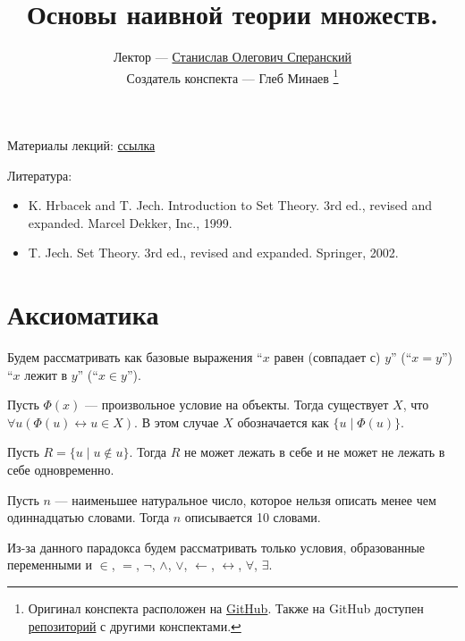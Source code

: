 \documentclass[12pt,a4paper]{article}
\title{Основы наивной теории множеств.}
\author{Лектор --- \href{https://users.math-cs.spbu.ru/~speranski}{Станислав Олегович Сперанский} \\
        Создатель конспекта --- Глеб Минаев
        \footnote{Оригинал конспекта расположен на \href{https://github.com/lounres/SPbU-MCS-2020-M-lecture-notes/blob/master/\%D0\%9D\%D0\%A2\%D0\%9C/ST.pdf}{GitHub}. Также на GitHub доступен \href{https://github.com/lounres/SPbU-MCS-2020-M-lecture-notes}{репозиторий} с другими конспектами.}}
\date{}
\begin{document}
    \maketitle

    \listoftodos[TODOs]

    \tableofcontents

    \vspace{2em}
    Материалы лекций: \href{https://users.math-cs.spbu.ru/~speranski/courses/sets-2020-autumn/materials.html}{ссылка}
    
    Литература:
    \begin{itemize}
        \item K. Hrbacek and T. Jech. Introduction to Set Theory. 3rd ed., revised and expanded. Marcel Dekker, Inc., 1999.
        \item T. Jech. Set Theory. 3rd ed., revised and expanded. Springer, 2002.
    \end{itemize}

    \section{Аксиоматика}

    Будем рассматривать как базовые выражения ``$x$ равен (совпадает с) $y$'' (``$x=y$'') ``$x$ лежит в $y$'' (``$x\in y$'').

    \begin{definition}
        Пусть $\Phi(x)$ --- произвольное условие на объекты. Тогда существует $X$, что $\forall u (\Phi(u) \leftrightarrow u \in X)$. В этом случае $X$ обозначается как $\{u \mid \Phi(u)\}$.
    \end{definition}

    \begin{statement}
        Пусть $R = \{u \mid u \notin u\}$. Тогда $R$ не может лежать в себе и не может не лежать в себе одновременно.
    \end{statement}

    \begin{statement}
        Пусть $n$ --- наименьшее натуральное число, которое нельзя описать менее чем одиннадцатью словами. Тогда $n$ описывается 10 словами.
    \end{statement}

    Из-за данного парадокса будем рассматривать только условия, образованные переменными и $\in$, $=$, $\neg$, $\wedge$, $\vee$, $\leftarrow$, $\leftrightarrow$, $\forall$, $\exists$.
\end{document}
